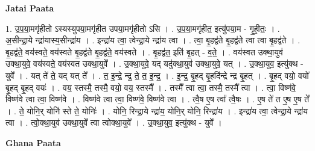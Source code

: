 \documentclass[17pt]{extarticle}
\begin{document}
\textbf{Jatai Paata} \newline

1. उ॒प॒या॒मगृ॑हीतो ऽस्यस्युपया॒मगृ॑हीत उपया॒मगृ॑हीतो ऽसि । . उ॒प॒या॒मगृ॑हीत॒ इत्यु॑पया॒म - गृ॒ही॒तः॒ । . अ॒सीन्द्रा॒ये न्द्रा॑यास्य॒सीन्द्रा॑य । . इन्द्रा॑य त्वा॒ त्वेन्द्रा॒ये न्द्रा॑य त्वा । . त्वा॒ बृ॒हद्व॑ते बृ॒हद्व॑ते त्वा त्वा बृ॒हद्व॑ते । . बृ॒हद्व॑ते॒ वय॑स्वते॒ वय॑स्वते बृ॒हद्व॑ते बृ॒हद्व॑ते॒ वय॑स्वते । . बृ॒हद्व॑त॒ इति॑ बृ॒हत् - व॒ते॒ । . वय॑स्वत उक्था॒युव॑ उक्था॒युवे॒ वय॑स्वते॒ वय॑स्वत उक्था॒युवे᳚ । . उ॒क्था॒युवे॒ यद् यदु॑क्था॒युव॑ उक्था॒युवे॒ यत् । . उ॒क्था॒युव॒ इत्यु॑क्थ - युवे᳚ । . यत् ते॑ ते॒ यद् यत् ते᳚ । . त॒ इ॒न्द्रे॒ न्द्र॒ ते॒ त॒ इ॒न्द्र॒ । . इ॒न्द्र॒ बृ॒हद् बृ॒हदि॑न्द्रे न्द्र बृ॒हत् । . बृ॒हद् वयो॒ वयो॑ बृ॒हद् बृ॒हद् वयः॑ । . वय॒ स्तस्मै॒ तस्मै॒ वयो॒ वय॒ स्तस्मै᳚ । . तस्मै᳚ त्वा त्वा॒ तस्मै॒ तस्मै᳚ त्वा । . त्वा॒ विष्ण॑वे॒ विष्ण॑वे त्वा त्वा॒ विष्ण॑वे । . विष्ण॑वे त्वा त्वा॒ विष्ण॑वे॒ विष्ण॑वे त्वा । . त्वै॒ष ए॒ष त्वा᳚ त्वै॒षः । . ए॒ष ते॑ त ए॒ष ए॒ष ते᳚ । . ते॒ योनि॒र् योनि॑ स्ते ते॒ योनिः॑ । . योनि॒ रिन्द्रा॒ये न्द्रा॑य॒ योनि॒र् योनि॒ रिन्द्रा॑य । . इन्द्रा॑य त्वा॒ त्वेन्द्रा॒ये न्द्रा॑य त्वा । . त्वो॒क्था॒युव॑ उक्था॒युवे᳚ त्वा त्वोक्था॒युवे᳚ । . उ॒क्था॒युव॒ इत्यु॑क्थ - युवे᳚ । \newline

\textbf{Ghana Paata } \newline
\end{document}
